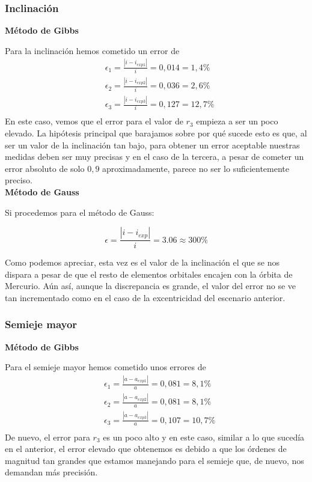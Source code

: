 \documentclass{article}
\numberwithin{equation}{section}
\begin{document}
\subsubsection{Inclinación}
\noindent\textbf{Método de Gibbs}\par
Para la inclinación hemos cometido un error de 
\begin{align*}
    &\epsilon_{1}=\frac{\left\lvert i-i_{exp1} \right\rvert }{i}=0,014=1,4\% \\
    &\epsilon_{2}=\frac{\left\lvert i-i_{exp2} \right\rvert }{i}=0,036=2,6\% \\
    &\epsilon_{3}=\frac{\left\lvert i-i_{exp3} \right\rvert }{i}=0,127=12,7\% \\
\end{align*}
En este caso, vemos que el error para el valor de $r_{3}$ empieza 
a ser un poco elevado. La hipótesis principal que barajamos 
sobre por qué sucede esto es que, al ser un valor de la inclinación 
tan bajo, para obtener un error aceptable nuestras medidas deben 
ser muy precisas y en el caso de la tercera, a pesar de cometer 
un error absoluto de solo $0,9$ aproximadamente, parece no 
ser lo suficientemente preciso.\\

\noindent\textbf{Método de Gauss}\par
Si procedemos para el método de Gauss:

\begin{equation*}
    \epsilon=\frac{\left\lvert i-i_{exp} \right\rvert}{i}=3.06\approx300\%
\end{equation*}

Como podemos apreciar, esta vez es el valor de la inclinación el que se nos dispara a pesar de que el resto de elementos orbitales encajen con la órbita de Mercurio. Aún así, aunque la discrepancia es grande, el valor del error no se ve tan incrementado como en el caso de la excentricidad del escenario anterior.

\subsubsection{Semieje mayor}
\noindent\textbf{Método de Gibbs}\par
Para el semieje mayor hemos cometido unos errores de 
\begin{align*}
    &\epsilon_{1}=\frac{\left\lvert a-a_{exp1} \right\rvert }{a}=0,081=8,1\% \\
    &\epsilon_{2}=\frac{\left\lvert a-a_{exp2} \right\rvert }{a}=0,081=8,1\% \\
    &\epsilon_{3}=\frac{\left\lvert a-a_{exp3} \right\rvert }{a}=0,107=10,7\% \\
\end{align*}
De nuevo, el error para $r_{3}$ es un poco alto y en este caso, 
similar a lo que sucedía en el anterior, el error elevado que 
obtenemos es debido a que los órdenes de magnitud tan grandes 
que estamos manejando para el semieje que, de nuevo, nos 
demandan más precisión.\\
\end{document}
